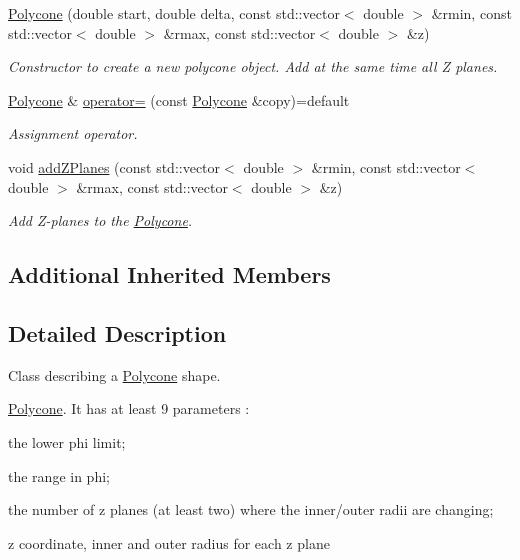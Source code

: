 \begin{DoxyCompactItemize}
\hyperlink{class_d_d4hep_1_1_geometry_1_1_polycone_aaa4e5a89826cbdbf7c1162175ee27c0f}{Polycone} (double start, double delta, const std\+::vector$<$ double $>$ \&rmin, const std\+::vector$<$ double $>$ \&rmax, const std\+::vector$<$ double $>$ \&z)
\begin{DoxyCompactList}\small\item\em Constructor to create a new polycone object. Add at the same time all Z planes. \end{DoxyCompactList}\item 
\hyperlink{class_d_d4hep_1_1_geometry_1_1_polycone}{Polycone} \& \hyperlink{class_d_d4hep_1_1_geometry_1_1_polycone_aacef9a0deaef223261d450b6c46edf6f}{operator=} (const \hyperlink{class_d_d4hep_1_1_geometry_1_1_polycone}{Polycone} \&copy)=default
\begin{DoxyCompactList}\small\item\em Assignment operator. \end{DoxyCompactList}\item 
void \hyperlink{class_d_d4hep_1_1_geometry_1_1_polycone_a4fde5687aa1badc803871e1517a3535d}{add\+Z\+Planes} (const std\+::vector$<$ double $>$ \&rmin, const std\+::vector$<$ double $>$ \&rmax, const std\+::vector$<$ double $>$ \&z)
\begin{DoxyCompactList}\small\item\em Add Z-\/planes to the \hyperlink{class_d_d4hep_1_1_geometry_1_1_polycone}{Polycone}. \end{DoxyCompactList}\end{DoxyCompactItemize}
\subsection*{Additional Inherited Members}


\subsection{Detailed Description}
Class describing a \hyperlink{class_d_d4hep_1_1_geometry_1_1_polycone}{Polycone} shape. 

\hyperlink{class_d_d4hep_1_1_geometry_1_1_polycone}{Polycone}. It has at least 9 parameters \+:
\begin{DoxyItemize}
\item the lower phi limit;
\item the range in phi;
\item the number of z planes (at least two) where the inner/outer radii are changing;
\item z coordinate, inner and outer radius for each z plane
\end{DoxyItemize}

